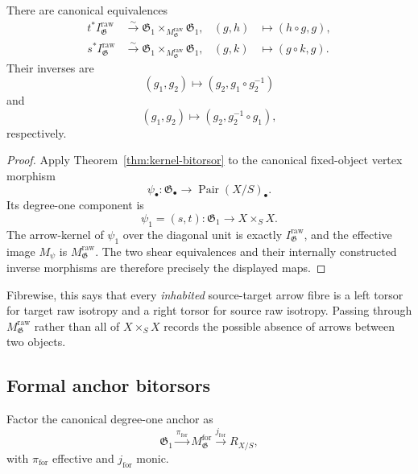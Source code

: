 \begin{theorem}
\label{thm:raw-bitorsor}
There are canonical equivalences
\[
\begin{aligned}
    t^*I^{\mathrm{raw}}_{\mathfrak G}
    &\xrightarrow{\sim}
    \mathfrak G_1
    \times_{M^{\mathrm{raw}}_{\mathfrak G}}
    \mathfrak G_1,
    &
    (g,h)&\longmapsto(h\circ g,g),\\
    s^*I^{\mathrm{raw}}_{\mathfrak G}
    &\xrightarrow{\sim}
    \mathfrak G_1
    \times_{M^{\mathrm{raw}}_{\mathfrak G}}
    \mathfrak G_1,
    &
    (g,k)&\longmapsto(g\circ k,g).
\end{aligned}
\]
Their inverses are
\[
    (g_1,g_2)
    \longmapsto
    (g_2,g_1\circ g_2^{-1})
\]
and
\[
    (g_1,g_2)
    \longmapsto
    (g_2,g_2^{-1}\circ g_1),
\]
respectively.
\end{theorem}

\begin{proof}
Apply Theorem~\ref{thm:kernel-bitorsor} to the canonical fixed-object vertex
morphism
\[
    \psi_\bullet:
    \mathfrak G_\bullet
    \longrightarrow
    \operatorname{Pair}(X/S)_\bullet.
\]
Its degree-one component is
\[
    \psi_1=(s,t):
    \mathfrak G_1\longrightarrow X\times_SX.
\]
The arrow-kernel of $\psi_1$ over the diagonal unit is exactly
$I^{\mathrm{raw}}_{\mathfrak G}$, and the effective image
$M_\psi$ is $M^{\mathrm{raw}}_{\mathfrak G}$.  The two shear equivalences and
their internally constructed inverse morphisms are therefore precisely the
displayed maps.
\end{proof}

\begin{remark}
Fibrewise, this says that every \emph{inhabited} source-target arrow fibre is
a left torsor for target raw isotropy and a right torsor for source raw
isotropy.  Passing through
$M^{\mathrm{raw}}_{\mathfrak G}$ rather than all of $X\times_SX$ records the
possible absence of arrows between two objects.
\end{remark}

\subsection{Formal anchor bitorsors}

Factor the canonical degree-one anchor as
\[
    \mathfrak G_1
    \xrightarrow{\pi_{\mathrm{for}}}
    M^{\mathrm{for}}_{\mathfrak G}
    \xrightarrow{j_{\mathrm{for}}}
    R_{X/S},
\]
with $\pi_{\mathrm{for}}$ effective and $j_{\mathrm{for}}$ monic.

